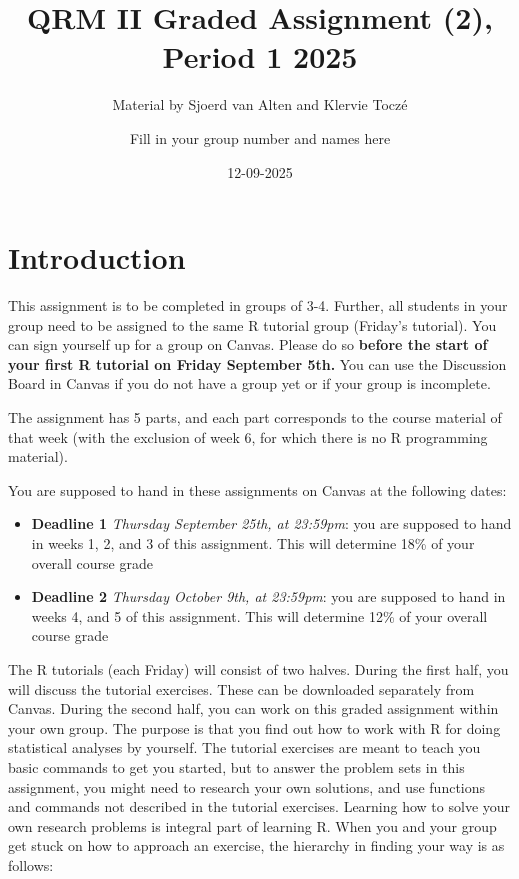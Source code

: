 \documentclass[
]{article}
\title{QRM II Graded Assignment (2), Period 1 2025}
\subtitle{Material by Sjoerd van Alten and Klervie Toczé}
\author{Fill in your group number and names here}
\date{12-09-2025}
\providecommand{\tightlist}{%
  \setlength{\itemsep}{0pt}\setlength{\parskip}{0pt}}
\begin{document}
\maketitle

\section{Introduction}\label{introduction}

This assignment is to be completed in groups of 3-4. Further, all
students in your group need to be assigned to the same R tutorial group
(Friday's tutorial). You can sign yourself up for a group on Canvas.
Please do so
\textbf{before the start of your first R tutorial on Friday September 5th.}
You can use the Discussion Board in Canvas if you do not have a group
yet or if your group is incomplete.

The assignment has 5 parts, and each part corresponds to the course
material of that week (with the exclusion of week 6, for which there is
no R programming material).

You are supposed to hand in these assignments on Canvas at the following
dates:

\begin{itemize}
\tightlist
\item
  \textbf{Deadline 1} \emph{Thursday September 25th, at 23:59pm}: you
  are supposed to hand in weeks 1, 2, and 3 of this assignment. This
  will determine 18\% of your overall course grade
\item
  \textbf{Deadline 2} \emph{Thursday October 9th, at 23:59pm}: you are
  supposed to hand in weeks 4, and 5 of this assignment. This will
  determine 12\% of your overall course grade
\end{itemize}

The R tutorials (each Friday) will consist of two halves. During the
first half, you will discuss the tutorial exercises. These can be
downloaded separately from Canvas. During the second half, you can work
on this graded assignment within your own group. The purpose is that you
find out how to work with R for doing statistical analyses by yourself.
The tutorial exercises are meant to teach you basic commands to get you
started, but to answer the problem sets in this assignment, you might
need to research your own solutions, and use functions and commands not
described in the tutorial exercises. Learning how to solve your own
research problems is integral part of learning R. When you and your
group get stuck on how to approach an exercise, the hierarchy in finding
your way is as follows:
\end{document}
